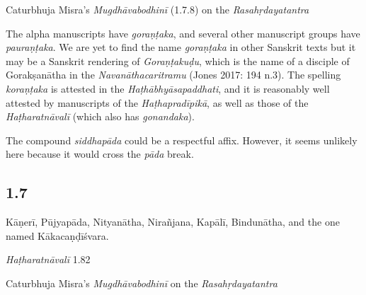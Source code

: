 \begin{ekdosis}
\begin{testimonia}[hp01_006]
Caturbhuja Misra's \emph{Mugdhāvabodhinī} (1.7.8) on the \emph{Rasahṛdayatantra}

\begin{versinnote}
\end{versinnote}

\end{testimonia}

\begin{philcomm}[hp01_006]        
The alpha manuscripts have \emph{goraṇṭaka}, and several other manuscript groups have \emph{pauraṇṭaka}.  We are yet to find the name \emph{goraṇṭaka} in other Sanskrit texts but it may be a Sanskrit rendering of \emph{Goraṇṭakuḍu}, which is the name of a disciple of Gorakṣanātha in the \emph{Navanāthacaritramu} (Jones 2017: 194 n.3). The spelling \emph{koraṇṭaka} is attested in the \emph{Haṭhābhyāsapaddhati}, and it is reasonably well attested by manuscripts of the \emph{Haṭhapradīpikā}, as well as those of the \emph{Haṭharatnāvalī} (which also has \emph{gonandaka}).

The compound \emph{siddhapāda} could be a respectful affix. However, it seems unlikely here because it would cross the \emph{pāda} break.  

\end{philcomm}

\subsection*{1.7}
\begin{translation}[hp01_007]
Kāṇerī, Pūjyapāda, Nityanātha, Nirañjana, Kapālī, Bindunātha, and the one named Kākacaṇḍīśvara.
\end{translation}

\begin{testimonia}[hp01_007]
\emph{Haṭharatnāvalī} 1.82

\begin{versinnote}
\end{versinnote}

Caturbhuja Misra's \emph{Mugdhāvabodhinī} on the \emph{Rasahṛdayatantra}

\begin{versinnote}
\end{versinnote}


\end{testimonia}
\end{ekdosis}
